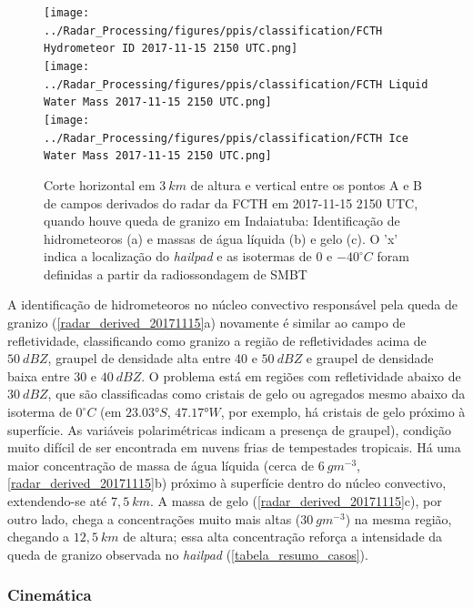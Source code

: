 \begin{figure}[htb]
	\centering
	\caption{Corte horizontal em $3\:km$ de altura e vertical entre os pontos A e B de campos derivados do radar da FCTH em 2017-11-15 2150 UTC, quando houve queda de granizo em Indaiatuba: Identificação de hidrometeoros (a) e massas de água líquida (b) e gelo (c). O 'x' indica a localização do \textit{hailpad} e as isotermas de $0$ e $-40^{\circ}C$ foram definidas a partir da radiossondagem de SMBT} 
	\label{radar_derived_20171115}
	\vspace{-5pt}
	\texttt{[image: ../Radar\_Processing/figures/ppis/classification/FCTH Hydrometeor ID 2017-11-15 2150 UTC.png]} \\
	\vspace{-5pt}
	\texttt{[image: ../Radar\_Processing/figures/ppis/classification/FCTH Liquid Water Mass 2017-11-15 2150 UTC.png]} \\
	\vspace{-5pt}
	\texttt{[image: ../Radar\_Processing/figures/ppis/classification/FCTH Ice Water Mass 2017-11-15 2150 UTC.png]} \\
\end{figure}

A identificação de hidrometeoros no núcleo convectivo responsável pela queda de granizo (\autoref{radar_derived_20171115}a) novamente é similar ao campo de refletividade, classificando como granizo a região de refletividades acima de $50\:dBZ$, graupel de densidade alta entre 40 e $50\:dBZ$ e graupel de densidade baixa entre 30 e $40\:dBZ$. O problema está em regiões com refletividade abaixo de $30\:dBZ$, que são classificadas como cristais de gelo ou agregados mesmo abaixo da isoterma de $0^{\circ}C$ (em $\ang{23.03}S$, $\ang{47.17}W$, por exemplo, há cristais de gelo próximo à superfície. As variáveis polarimétricas indicam a presença de graupel), condição muito difícil de ser encontrada em nuvens frias de tempestades tropicais. Há uma maior concentração de massa de água líquida (cerca de $6\:gm^{-3}$, \autoref{radar_derived_20171115}b) próximo à superfície dentro do núcleo convectivo, extendendo-se até $7,5\:km$. A massa de gelo (\autoref{radar_derived_20171115}c), por outro lado, chega a concentrações muito mais altas ($30\:gm^{-3}$)  na mesma região, chegando a $12,5\:km$ de altura; essa alta concentração reforça a intensidade da queda de granizo observada no \textit{hailpad} (\autoref{tabela_resumo_casos}).

\subsubsection{Cinemática}\label{cinematica_20171115}

